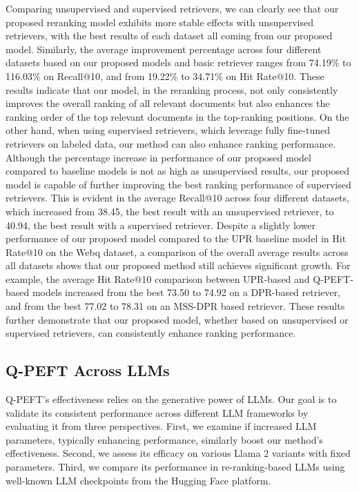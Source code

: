 \documentclass[sigconf,natbib=true,anonymous=false]{acmart}
\begin{document}
Comparing unsupervised and supervised retrievers, we can clearly see that our proposed reranking model exhibits more stable effects with unsupervised retrievers, with the best results of each dataset all coming from our proposed model. Similarly, the average improvement percentage across four different datasets based on our proposed models and basic retriever ranges from 74.19\% to 116.03\% on Recall@10, and from 19.22\% to 34.71\% on Hit Rate@10. These results indicate that our model, in the reranking process, not only consistently improves the overall ranking of all relevant documents but also enhances the ranking order of the top relevant documents in the top-ranking positions. On the other hand, when using supervised retrievers, which leverage fully fine-tuned retrievers on labeled data, our method can also enhance ranking performance. Although the percentage increase in performance of our proposed model compared to baseline models is not as high as unsupervised results, our proposed model is capable of further improving the best ranking performance of supervised retrievers. This is evident in the average Recall@10 across four different datasets, which increased from 38.45, the best result with an unsupervised retriever, to 40.94, the best result with a supervised retriever. Despite a slightly lower performance of our proposed model compared to the UPR baseline model in Hit Rate@10 on the Webq dataset, a comparison of the overall average results across all datasets shows that our proposed method still achieves significant growth. For example, the average Hit Rate@10 comparison between UPR-based and Q-PEFT-based models increased from the best 73.50 to 74.92 on a DPR-based retriever, and from the best 77.02 to 78.31 on an MSS-DPR based retriever. These results further demonstrate that our proposed model, whether based on unsupervised or supervised retrievers, can consistently enhance ranking performance.

\subsection{Q-PEFT Across LLMs}
\label{sec: various_llms}

Q-PEFT's effectiveness relies on the generative power of LLMs. Our goal is to validate its consistent performance across different LLM frameworks by evaluating it from three perspectives. First, we examine if increased LLM parameters, typically enhancing performance, similarly boost our method's effectiveness. Second, we assess its efficacy on various Llama 2 variants with fixed parameters. Third, we compare its performance in re-ranking-based LLMs using well-known LLM checkpoints from the Hugging Face platform.
\end{document}
